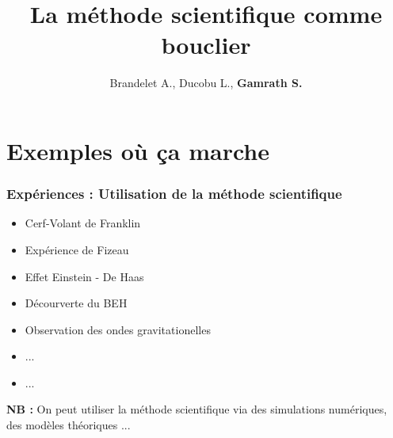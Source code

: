 \documentclass[11pt]{beamer}
\begin{document}
	\author{Brandelet A., Ducobu L., \textbf{Gamrath S.}}
	\title{La méthode scientifique comme bouclier}
	\date{}
	\begin{frame}[plain]
	\maketitle
\end{frame}
\section{Exemples où ça marche}
\begin{frame}
\frametitle{Expériences : Utilisation de la méthode scientifique}
\begin{itemize}
	\item Cerf-Volant de Franklin
	\item Expérience de Fizeau
	\item Effet Einstein - De Haas
	\item Décourverte du BEH
	\item Observation des ondes gravitationelles
	\item ... \pause 
	\item ...
\end{itemize}
\pause \textbf{NB :} On peut utiliser la méthode scientifique via des simulations numériques, des modèles théoriques ...
\end{frame}
\end{document}
